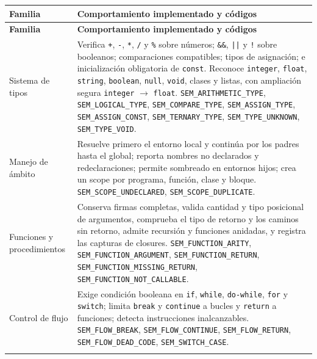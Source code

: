\documentclass[11pt,a4paper]{article}
\begin{document}
\begin{longtable}{@{}p{3.6cm}L{11.4cm}@{}}
\toprule
\textbf{Familia} & \textbf{Comportamiento implementado y códigos} \\
\midrule
\endfirsthead
\toprule
\textbf{Familia} & \textbf{Comportamiento implementado y códigos} \\
\midrule
\endhead

Sistema de tipos &
Verifica \texttt{+}, \texttt{-}, \texttt{*}, \texttt{/} y \texttt{\%} sobre
números; \texttt{\&\&}, \texttt{||} y \texttt{!} sobre booleanos; comparaciones
compatibles; tipos de asignación; e inicialización obligatoria de
\texttt{const}. Reconoce \texttt{integer}, \texttt{float}, \texttt{string},
\texttt{boolean}, \texttt{null}, \texttt{void}, clases y listas, con ampliación
segura \texttt{integer} $\rightarrow$ \texttt{float}.
\newline
\texttt{SEM\_ARITHMETIC\_TYPE}, \texttt{SEM\_LOGICAL\_TYPE},
\texttt{SEM\_COMPARE\_TYPE}, \texttt{SEM\_ASSIGN\_TYPE},
\texttt{SEM\_ASSIGN\_CONST}, \texttt{SEM\_TERNARY\_TYPE},
\texttt{SEM\_TYPE\_UNKNOWN}, \texttt{SEM\_TYPE\_VOID}. \\
\addlinespace

Manejo de ámbito &
Resuelve primero el entorno local y continúa por los padres hasta el global;
reporta nombres no declarados y redeclaraciones; permite sombreado en entornos
hijos; crea un scope por programa, función, clase y bloque.
\newline
\texttt{SEM\_SCOPE\_UNDECLARED}, \texttt{SEM\_SCOPE\_DUPLICATE}. \\
\addlinespace

Funciones y procedimientos &
Conserva firmas completas, valida cantidad y tipo posicional de argumentos,
comprueba el tipo de retorno y los caminos sin retorno, admite recursión y
funciones anidadas, y registra las capturas de closures.
\newline
\texttt{SEM\_FUNCTION\_ARITY}, \texttt{SEM\_FUNCTION\_ARGUMENT},
\texttt{SEM\_FUNCTION\_RETURN}, \texttt{SEM\_FUNCTION\_MISSING\_RETURN},
\texttt{SEM\_FUNCTION\_NOT\_CALLABLE}. \\
\addlinespace

Control de flujo &
Exige condición booleana en \texttt{if}, \texttt{while}, \texttt{do-while},
\texttt{for} y \texttt{switch}; limita \texttt{break} y \texttt{continue} a
bucles y \texttt{return} a funciones; detecta instrucciones inalcanzables.
\newline
\texttt{SEM\_FLOW\_BREAK}, \texttt{SEM\_FLOW\_CONTINUE},
\texttt{SEM\_FLOW\_RETURN}, \texttt{SEM\_FLOW\_DEAD\_CODE},
\texttt{SEM\_SWITCH\_CASE}. \\
\addlinespace


\end{longtable}
\end{document}
